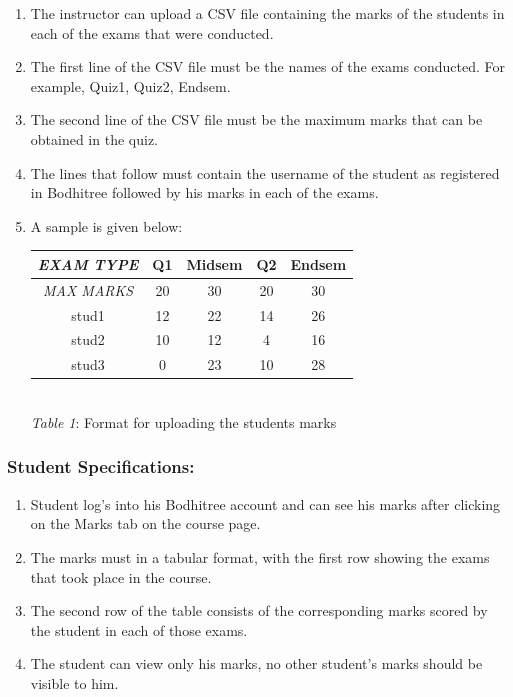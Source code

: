 \begin{enumerate}
	\item The instructor can upload a CSV file containing the marks of the students in each of the exams that were conducted.
	\item The first line of the CSV file must be the names of the exams conducted. For example, Quiz1, Quiz2, Endsem.
	\item The second line of the CSV file must be the maximum marks that can be obtained in the quiz.
	\item The lines that follow must contain the username of the student as registered in Bodhitree followed by his marks in each of the exams.
	\item A sample is given below:
	
	\begin{center}
	\def\arraystretch{1.5}
	\begin{tabular}{|c|c|c|c|c|}
	\hline \textit{EXAM TYPE} & Q1 & Midsem & Q2 & Endsem \\ 
	\hline \textit{MAX MARKS} & 20 & 30 & 20 & 30 \\ 
	\hline stud1 & 12 & 22 & 14 & 26 \\
	\hline stud2 & 10 & 12 & 4 & 16 \\
	\hline stud3 & 0 & 23 & 10 & 28 \\
	\hline 
	\end{tabular} 
	\\ 	\vspace{0.2in} \textit{Table 1}: Format for uploading the students marks
	\end{center}
	
\end{enumerate}

\subsubsection*{Student Specifications:}

\begin{enumerate}
	\item Student log's into his Bodhitree account and can see his marks after clicking on the Marks tab on the course page.
	\item The marks must in a tabular format, with the first row showing the exams that took place in the course.
	\item The second row of the table consists of the corresponding marks scored by the student in each of those exams.
	\item The student can view only his marks, no other student's marks should be visible to him.
\end{enumerate}

